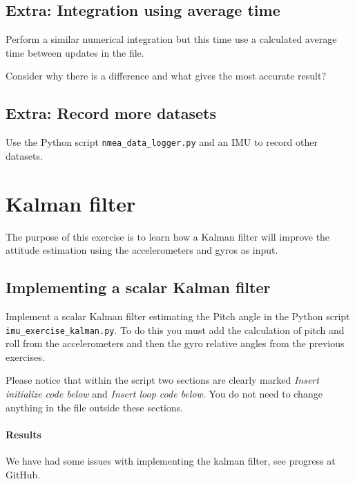 \documentclass[paper=letter, fontsize=10pt]{article}
\begin{document}
\subsection{Extra: Integration using average time}

Perform a similar numerical integration but this time use a calculated average time between updates in the file.

Consider why there is a difference and what gives the most accurate result?

\subsection{Extra: Record more datasets}

Use the Python script \texttt{nmea\_data\_logger.py} and an IMU to record other datasets. 


\section{Kalman filter}

The purpose of this exercise is to learn how a Kalman filter will improve the attitude estimation using the accelerometers and gyros as input.

\subsection{Implementing a scalar Kalman filter}

Implement a scalar Kalman filter estimating the Pitch angle in the Python script \texttt{imu\_exercise\_kalman.py}. To do this you must add the calculation of pitch and roll from the accelerometers and then the gyro relative angles from the previous exercises.

Please notice that within the script two sections are clearly marked \textit{Insert initialize code below} and \textit{Insert loop code below}. You do not need to change anything in the file outside these sections.

\paragraph{Results}
We have had some issues with implementing the kalman filter, see progress at GitHub.




\end{document}
